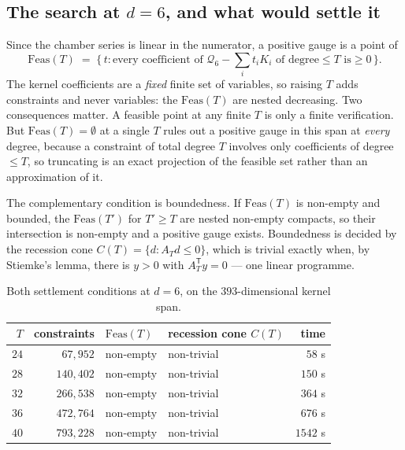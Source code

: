 \documentclass[11pt,a4paper]{article}
\newcommand{\Qd}{\mathcal{Q}}
\theoremstyle{plain}
\theoremstyle{definition}
\theoremstyle{remark}
\begin{document}
\subsection{The search at \texorpdfstring{$d = 6$}{d = 6}, and what would settle it}

Since the chamber series is linear in the numerator, a positive gauge is a point of
\[
  \mathrm{Feas}(T) \;=\; \{\, t : \text{every coefficient of } \Qd_6 - \textstyle\sum_i t_i K_i
  \text{ of degree} \le T \text{ is} \ge 0 \,\}.
\]
The kernel coefficients are a \emph{fixed} finite set of variables, so raising $T$ adds
constraints and never variables: the $\mathrm{Feas}(T)$ are nested decreasing. Two consequences
matter. A feasible point at any finite $T$ is only a finite verification. But
$\mathrm{Feas}(T) = \emptyset$ at a single $T$ rules out a positive gauge in this span at
\emph{every} degree, because a constraint of total degree $T$ involves only coefficients of
degree $\le T$, so truncating is an exact projection of the feasible set rather than an
approximation of it.

The complementary condition is boundedness. If $\mathrm{Feas}(T)$ is non-empty and bounded, the
$\mathrm{Feas}(T')$ for $T' \ge T$ are nested non-empty compacts, so their intersection is
non-empty and a positive gauge exists. Boundedness is decided by the recession cone
$C(T) = \{d : A_T d \le 0\}$, which is trivial exactly when, by Stiemke's lemma, there is
$y > 0$ with $A_T^{\mathsf T} y = 0$ --- one linear programme.

\begin{table}[ht]
\centering
\caption{Both settlement conditions at $d = 6$, on the $393$-dimensional kernel span.}
\label{tab:d6sweep}
\small
\begin{tabularx}{\textwidth}{@{}rrLLr@{}}
\toprule
 $T$ & constraints & $\mathrm{Feas}(T)$ & recession cone $C(T)$ & time \\
\midrule
 $24$ & $67{,}952$  & non-empty & non-trivial & $58$ s \\
 $28$ & $140{,}402$ & non-empty & non-trivial & $150$ s \\
 $32$ & $266{,}538$ & non-empty & non-trivial & $364$ s \\
 $36$ & $472{,}764$ & non-empty & non-trivial & $676$ s \\
 $40$ & $793{,}228$ & non-empty & non-trivial & $1542$ s \\
\bottomrule
\end{tabularx}
\end{table}
\end{document}
